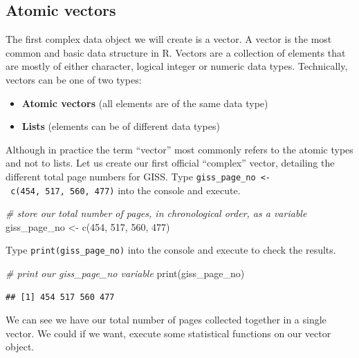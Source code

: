 \documentclass[
]{book}
\newenvironment{Shaded}{\begin{snugshade}}{\end{snugshade}}
\newcommand{\CommentTok}[1]{\textcolor[rgb]{0.56,0.35,0.01}{\textit{#1}}}
\newcommand{\DecValTok}[1]{\textcolor[rgb]{0.00,0.00,0.81}{#1}}
\newcommand{\FunctionTok}[1]{\textcolor[rgb]{0.00,0.00,0.00}{#1}}
\newcommand{\NormalTok}[1]{#1}
\newcommand{\OtherTok}[1]{\textcolor[rgb]{0.56,0.35,0.01}{#1}}
\providecommand{\tightlist}{%
  \setlength{\itemsep}{0pt}\setlength{\parskip}{0pt}}
\begin{document}
\hypertarget{atomic-vectors}{%
\subsection{Atomic vectors}\label{atomic-vectors}}

The first complex data object we will create is a vector. A vector is the most common and basic data structure in R. Vectors are a collection of elements that are mostly of either character, logical integer or numeric data types. Technically, vectors can be one of two types:

\begin{itemize}
\tightlist
\item
  \textbf{Atomic vectors} (all elements are of the same data type)
\item
  \textbf{Lists} (elements can be of different data types)
\end{itemize}

Although in practice the term ``vector'' most commonly refers to the atomic types and not to lists. Let us create our first official ``complex'' vector, detailing the different total page numbers for GISS. Type \texttt{giss\_page\_no\ \textless{}-\ c(454,\ 517,\ 560,\ 477)} into the console and execute.

\begin{Shaded}
\begin{Highlighting}[]
\CommentTok{\# store our total number of pages, in chronological order, as a variable}
\NormalTok{giss\_page\_no }\OtherTok{\textless{}{-}} \FunctionTok{c}\NormalTok{(}\DecValTok{454}\NormalTok{, }\DecValTok{517}\NormalTok{, }\DecValTok{560}\NormalTok{, }\DecValTok{477}\NormalTok{)}
\end{Highlighting}
\end{Shaded}

Type \texttt{print(giss\_page\_no)} into the console and execute to check the results.

\begin{Shaded}
\begin{Highlighting}[]
\CommentTok{\# print our giss\_page\_no variable}
\FunctionTok{print}\NormalTok{(giss\_page\_no)}
\end{Highlighting}
\end{Shaded}

\begin{verbatim}
## [1] 454 517 560 477
\end{verbatim}

We can see we have our total number of pages collected together in a single vector. We could if we want, execute some statistical functions on our vector object.
\end{document}
